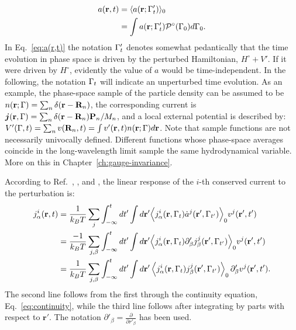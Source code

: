 \begin{equation}
  \begin{aligned}
    a(\mathbf{r},t) &= \langle a(\mathbf{r};\rGamma'_t)\rangle_0 \\
    &= \int a(\mathbf{r};\rGamma'_t) \mathcal{P}^\circ(\rGamma_0) d\rGamma_0.
  \end{aligned} \label{eq:a(r,t)}
\end{equation}
In Eq.~\eqref{eq:a(r,t)} the notation ${\mathrm\Gamma}'_t$ denotes somewhat pedantically that the time evolution in phase space is driven by the perturbed Hamiltonian, $H^\circ+V'$. If it were driven by $H^\circ$, evidently the value of $a$ would be time-independent. In the following, the notation ${\mathrm\Gamma}_t$ will indicate an unperturbed time evolution. As an example, the phase-space sample of the particle density can be assumed to be $n(\mathbf{r};{\mathrm\Gamma}) = \sum_n \delta (\mathbf{r}-\mathbf{R}_n)$, the corresponding current is $\bm{j} (\mathbf{r}, {\mathrm\Gamma}) = \sum_n \delta(\mathbf{r}-\mathbf{R}_n) \mathbf{P}_n / M_n $, and a local external potential is described by: $V'({\mathrm\Gamma},t)=\sum_n v(\mathbf{R}_n,t)=\int v'(\mathbf{r},t) n(\mathbf{r};{\mathrm\Gamma}) d \mathbf{r}$. Note that sample functions are not necessarily univocally defined. Different functions whose phase-space averages coincide in the long-wavelength limit sample the same hydrodynamical variable. More on this in Chapter~\ref{ch:gauge-invariance}.

According to Ref.~, , and , the linear response of the $i$-th conserved current to the perturbation is:
\begin{align}
  j_\alpha^i(\mathbf{r},t) & = \frac{1}{k_B T} \sum_j \int_{-\infty}^t dt' \int d\mathbf{r}' \Bigl \langle j_\alpha^i(\mathbf{r},\rGamma_t)\dot a^j(\mathbf{r}',\rGamma_{t'})\Bigr \rangle_0 v^j(\mathbf{r}',t') \\
  &= \frac{-1}{k_B T} \sum_{j,\beta} \int_{-\infty}^t dt' \int d\mathbf{r}' \Bigl \langle j_\alpha^i(\mathbf{r},\rGamma_t) \partial'_\beta j_\beta^j(\mathbf{r}',\rGamma_{t'})\Bigr \rangle_0 v^j(\mathbf{r}',t') \\
  &= \frac{1}{k_B T} \sum_{j,\beta} \int_{-\infty}^t dt' \int d\mathbf{r}' \left \langle j_\alpha^i(\mathbf{r},\rGamma_{t}) j_\beta^j(\mathbf{r}',\rGamma_{t'})\right \rangle_0 \partial'_\beta v^j(\mathbf{r}',t'). \label{eq:linear-response-c}
\end{align}
The second line follows from the first through the continuity equation, Eq.~\eqref{eq:continuity}, while the third line follows after integrating by parts with respect to $\mathbf{r}'$. The notation $\partial'_\beta=\frac{\partial}{\partial r'_\beta}$ has been used.

